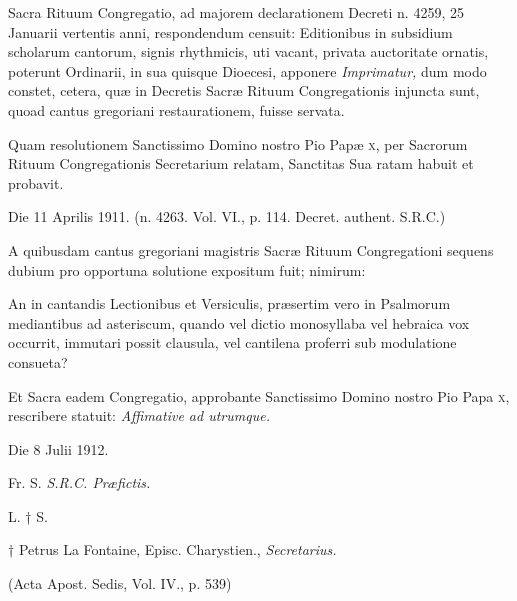 \documentclass[vesperale_romanum.tex]{subfiles}
\begin{document}
Sacra Rituum Congregatio, ad majorem declarationem Decreti n. 4259, 25 Januarii vertentis anni, respondendum censuit:
Editionibus in subsidium scholarum cantorum, signis rhythmicis, uti vacant, privata au\-ctoritate ornatis, poterunt Ordinarii, in sua quisque Dioecesi, apponere \textit{Imprimatur,} dum modo constet, cetera, quæ in Decretis Sacræ Rituum Congregationis injun\-cta sunt, quoad cantus gregoriani restaurationem, fuisse servata.

Quam resolutionem San\-ctissimo Domino nostro Pio Papæ \textsc{x}, per Sacrorum Rituum Congregationis Secretarium relatam, San\-ctitas Sua ratam habuit et probavit.

Die 11 Aprilis 1911. {\hfill(n. 4263. Vol. VI., p. 114. Decret. authent. S.R.C.)}
\vspace{5ex}%

{\centering{}\par} %

{}

A quibusdam cantus gregoriani magistris Sacræ Rituum Congregationi sequens dubium pro opportuna solutione expositum fuit; nimirum:

An in cantandis Le\-ctionibus et Versiculis, præsertim vero in Psalmorum mediantibus ad asteriscum, quando vel di\-ctio monosyllaba vel hebraica vox occurrit, immutari possit clausula, vel cantilena proferri sub modulatione consueta?

Et Sacra eadem Congregatio, approbante San\-ctissimo Domino nostro Pio Papa \textsc{x}, rescribere statuit: \textit{Affimative ad utrumque.}

Die 8 Julii 1912.

\hfill{Fr. S.  \textit{S.R.C. Præfi\-ctis.}}

L. † S.

{\hfill † Petrus La Fontaine, Episc. Charystien., \textit{Secretarius.}}

(A\-cta Apost. Sedis, Vol. IV., p. 539)
\vspace{5ex}%

{\centering{}\par} %

{}
\end{document}
